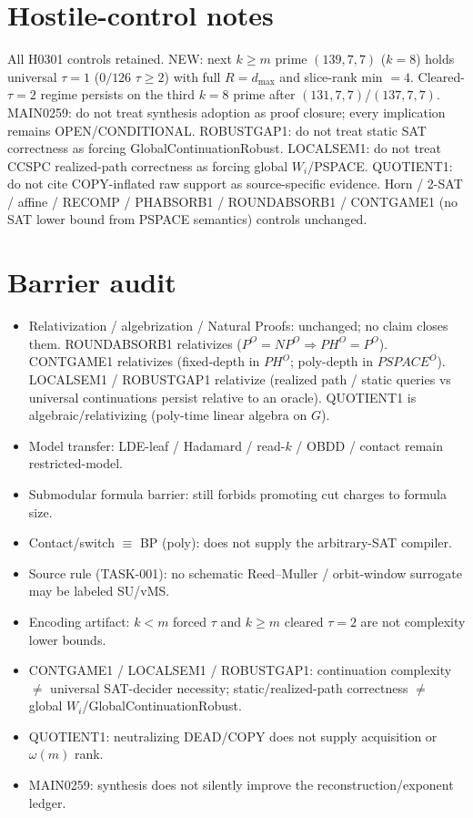 \documentclass[11pt]{article}
\begin{document}
\section*{Hostile-control notes}
All H0301 controls retained. NEW: next $k{\ge}m$ prime $(139,7,7)$ ($k{=}8$) holds universal
$\tau{=}1$ ($0/126$ $\tau{\ge}2$) with full $R{=}d_{\max}$ and slice-rank min $=4$.
Cleared-$\tau{=}2$ regime persists on the third $k{=}8$ prime after $(131,7,7)$/$(137,7,7)$.
MAIN0259: do not treat synthesis adoption as proof closure; every implication remains OPEN/CONDITIONAL.
ROBUSTGAP1: do not treat static SAT correctness as forcing GlobalContinuationRobust.
LOCALSEM1: do not treat CCSPC realized-path correctness as forcing global $W_i$/PSPACE.
QUOTIENT1: do not cite COPY-inflated raw support as source-specific evidence. Horn / 2-SAT / affine /
RECOMP / PHABSORB1 / ROUNDABSORB1 / CONTGAME1 (no SAT lower bound from PSPACE semantics)
controls unchanged.

\section*{Barrier audit}
\begin{itemize}
\item Relativization / algebrization / Natural Proofs: unchanged; no claim closes them.
  ROUNDABSORB1 relativizes ($P^O{=}NP^O\Rightarrow PH^O{=}P^O$).
  CONTGAME1 relativizes (fixed-depth in $PH^O$; poly-depth in $PSPACE^O$).
  LOCALSEM1 / ROBUSTGAP1 relativize (realized path / static queries vs universal continuations
  persist relative to an oracle).
  QUOTIENT1 is algebraic/relativizing (poly-time linear algebra on $G$).
\item Model transfer: LDE-leaf / Hadamard / read-$k$ / OBDD / contact remain restricted-model.
\item Submodular formula barrier: still forbids promoting cut charges to formula size.
\item Contact/switch $\equiv$ BP (poly): does not supply the arbitrary-SAT compiler.
\item Source rule (TASK-001): no schematic Reed--Muller / orbit-window surrogate may be labeled SU/vMS.
\item Encoding artifact: $k{<}m$ forced $\tau$ and $k{\ge}m$ cleared $\tau{=}2$ are not complexity lower bounds.
\item CONTGAME1 / LOCALSEM1 / ROBUSTGAP1: continuation complexity $\neq$ universal SAT-decider necessity;
  static/realized-path correctness $\neq$ global $W_i$/GlobalContinuationRobust.
\item QUOTIENT1: neutralizing DEAD/COPY does not supply acquisition or $\omega(m)$ rank.
\item MAIN0259: synthesis does not silently improve the reconstruction/exponent ledger.
\end{itemize}
\end{document}
